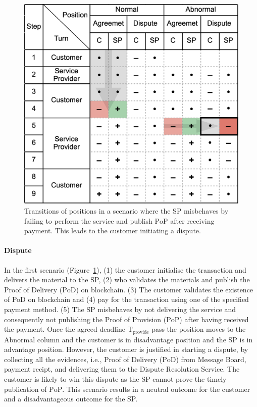 \documentclass[pdftex,twocolumn,epjc3]{svjour3}
\begin{document}
\begin{figure}[h!]
\includegraphics[width=\linewidth]{misbehaviour.png}
\centering
\caption{Transitions of positions in a scenario where the SP misbehaves by failing to perform the service and publish $\mathrm{PoP}$ after receiving payment. This leads to the customer initiating a dispute.}
\label{fig:misbehaviour}
\end{figure}

\paragraph{Dispute}
In the first scenario (Figure~\ref{fig:misbehaviour}), (1) the customer initialise the transaction and delivers the material to the SP, (2) who validates the materials and publish the Proof of Delivery ($\mathrm{PoD}$) on blockchain. (3) The customer validates the existence of PoD on blockchain and (4) pay for the transaction using one of the specified payment method. (5) The SP misbehaves by not delivering the service and consequently not publishing the Proof of Provision ($\mathrm{PoP}$) after having received the payment. Once the agreed deadline $\mathrm{T}_\mathrm{provide}$ pass the position moves to the Abnormal column and the customer is in disadvantage position and the SP is in advantage position. However, the customer is justified in starting a dispute, by collecting all the evidences, i.e., Proof of Delivery ($\mathrm{PoD}$) from Message Board, payment $\mathrm{recipt}$, and delivering them to the Dispute Resolution Service. The customer is likely to win this dispute as the SP cannot prove the timely publication of $\mathrm{PoP}$. This scenario results in a neutral outcome for the customer and a disadvantageous outcome for the SP.
\end{document}
